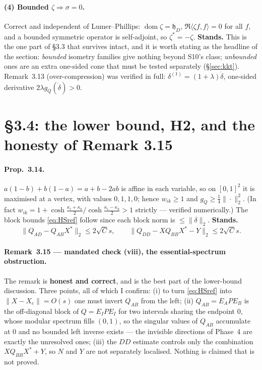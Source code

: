 \documentclass[11pt]{article}
\newcommand{\hh}{\mathfrak h}
\begin{document}
\paragraph{(4) Bounded $\zeta\Rightarrow\sigma=0$.}  Correct and independent of
Lumer--Phillips: $\operatorname{dom}\zeta=\hh_D$, $\Re\langle\zeta f,f\rangle=0$ for all
$f$, and a bounded symmetric operator is self-adjoint, so $\zeta^*=-\zeta$.
\textbf{Stands.}  This is the one part of \S3.3 that survives intact, and it is worth
stating as the headline of the section: \emph{bounded} isometry families give nothing
beyond S10's class; \emph{unbounded} ones are an extra one-sided cone that must be tested
separately (\S\ref{sec:kkt}).  Remark~3.13 (over-compression) was verified in full:
$\delta^{(1)}=(1+\lambda)\dot\delta$, one-sided derivative $2\lambda g_Q(\dot\delta)>0$.

\section{\S3.4: the lower bound, H2, and the honesty of Remark 3.15}\label{sec:lower}

\paragraph{Prop.~3.14.}  $a(1-b)+b(1-a)=a+b-2ab$ is affine in each variable, so on
$[0,1]^2$ it is maximised at a vertex, with values $0,1,1,0$; hence $w_{ik}\ge1$ and
$g_Q\ge\frac14\|\cdot\|_2^2$.  (In fact $w_{ik}=1+\cosh\frac{\kappa_i+\kappa_k}2/
\cosh\frac{\kappa_i-\kappa_k}2>1$ strictly --- verified numerically.)  The block bounds
\eqref{eq:HSref} follow since each block norm is $\le\|\delta\|_2$.  \textbf{Stands.}
\begin{equation}\label{eq:HSref}
 \|Q_{AD}-Q_{AB}X^*\|_2\le2\sqrt Cs,\qquad \|Q_{DD}-XQ_{BB}X^*-Y\|_2\le2\sqrt Cs .
\end{equation}

\paragraph{Remark~3.15 --- mandated check (viii), the essential-spectrum obstruction.}
The remark is \textbf{honest and correct}, and is the best part of the lower-bound
discussion.  Three points, all of which I confirm: (i) to turn \eqref{eq:HSref} into
$\|X-X_c\|=O(s)$ one must invert $Q_{AB}$ from the left; (ii) $Q_{AB}=E_APE_B$ is the
off-diagonal block of $Q=E_IPE_I$ for two intervals sharing the endpoint $0$, whose
modular spectrum fills $(0,1)$, so the singular values of $Q_{AB}$ accumulate at $0$ and no
bounded left inverse exists --- the invisible directions of Phase~4 are exactly the
unresolved ones; (iii) the $DD$ estimate controls only the combination $XQ_{BB}X^*+Y$, so
$N$ and $Y$ are not separately localised.  Nothing is claimed that is not proved.
\end{document}
